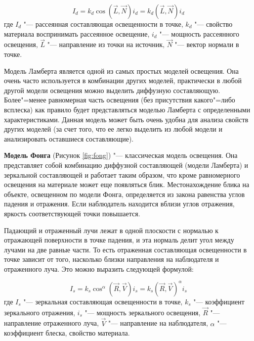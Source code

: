 \begin{equation}
    I_{d} = k_{d}\cos(\vec{L}, \vec{N})i_{d} = k_{d}(\vec{L}, \vec{N})i_{d}
\end{equation}
где $I_{d}$ "--- рассеянная составляющая освещенности в точке, $k_{d}$ "--- свойство материала воспринимать рассеянное освещение, $i_{d}$ "--- мощность рассеянного освещения, $\vec{L}$ "--- направление из точки на источник, $\vec{N}$ "--- вектор нормали в точке\cite{light_models}.

Модель Ламберта является одной из самых простых моделей освещения. Она очень часто используется в комбинации других моделей, практически в любой другой модели освещения можно выделить диффузную составляющую. Более"=менее равномерная часть освещения (без присутствия какого"=либо всплеска) как правило будет представляться моделью Ламберта с определенными характеристиками. Данная модель может быть очень удобна для анализа свойств других моделей (за счет того, что ее легко выделить из любой модели и анализировать оставшиеся составляющие).

\textbf{Модель Фонга} (Рисунок \ref{fig:fong}) "--- классическая модель освещения. Она представляет собой комбинацию диффузной составляющей (модели Ламберта) и зеркальной составляющей и работает таким образом, что кроме равномерного освещения на материале может еще появляться блик. Местонахождение блика на объекте, освещенном по модели Фонга, определяется из закона равенства углов падения и отражения. Если наблюдатель находится вблизи углов отражения, яркость соответствующей точки повышается.

Падающий и отраженный лучи лежат в одной плоскости с нормалью к отражающей поверхности в точке падения, и эта нормаль делит угол между лучами на две равные части. То есть отраженная составляющая освещенности в точке зависит от того, насколько близки направления на наблюдателя и отраженного луча. Это можно выразить следующей формулой:

\begin{equation}
    I_{s} = k_{s}\cos^{\alpha}(\vec{R}, \vec{V})i_{s} = k_{s}(\vec{R}, \vec{V})^{\alpha}i_{s}
\end{equation}
где $I_{s}$ "--- зеркальная составляющая освещенности в точке, $k_{s}$ "--- коэффициент зеркального отражения, $i_{s}$ "--- мощность зеркального освещения, $\vec{R}$ "--- направление отраженного луча, $\vec{V}$ "--- направление на наблюдателя, $\alpha$ "--- коэффициент блеска, свойство материала\cite{light_models}.